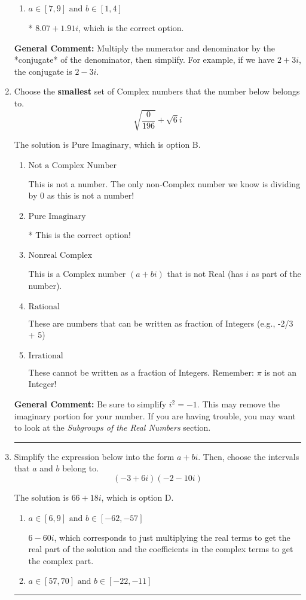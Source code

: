 \documentclass{extbook}[14pt]
\newcommand{\litem}[1]{\item #1

\rule{\textwidth}{0.4pt}}
\begin{document}
\begin{enumerate}
{\begin{enumerate}[label=\Alph*.]
 $5.40  + 9.43 i$, which corresponds to just dividing the first term by the first term and the second by the second.
\item \( a \in [7, 9] \text{ and } b \in [1, 4] \)

* $8.07  + 1.91 i$, which is the correct option.
\end{enumerate}

\textbf{General Comment:} Multiply the numerator and denominator by the *conjugate* of the denominator, then simplify. For example, if we have $2+3i$, the conjugate is $2-3i$.
}
\litem{
Choose the \textbf{smallest} set of Complex numbers that the number below belongs to.
\[ \sqrt{\frac{0}{196}}+\sqrt{6}i \]

The solution is \( \text{Pure Imaginary} \), which is option B.\begin{enumerate}[label=\Alph*.]
\item \( \text{Not a Complex Number} \)

This is not a number. The only non-Complex number we know is dividing by 0 as this is not a number!
\item \( \text{Pure Imaginary} \)

* This is the correct option!
\item \( \text{Nonreal Complex} \)

This is a Complex number $(a+bi)$ that is not Real (has $i$ as part of the number).
\item \( \text{Rational} \)

These are numbers that can be written as fraction of Integers (e.g., -2/3 + 5)
\item \( \text{Irrational} \)

These cannot be written as a fraction of Integers. Remember: $\pi$ is not an Integer!
\end{enumerate}

\textbf{General Comment:} Be sure to simplify $i^2 = -1$. This may remove the imaginary portion for your number. If you are having trouble, you may want to look at the \textit{Subgroups of the Real Numbers} section.
}
\litem{
Simplify the expression below into the form $a+bi$. Then, choose the intervals that $a$ and $b$ belong to.
\[ (-3 + 6 i)(-2 - 10 i) \]

The solution is \( 66 + 18 i \), which is option D.\begin{enumerate}[label=\Alph*.]
\item \( a \in [6, 9] \text{ and } b \in [-62, -57] \)

 $6 - 60 i$, which corresponds to just multiplying the real terms to get the real part of the solution and the coefficients in the complex terms to get the complex part.
\item \( a \in [57, 70] \text{ and } b \in [-22, -11] \)


\end{enumerate}}
\end{enumerate}
\end{document}
